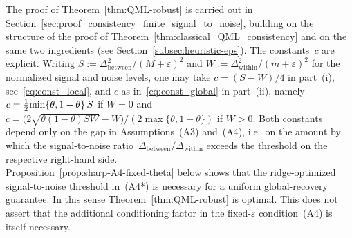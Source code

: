 \documentclass[10pt, letterpaper]{amsart}
\def\min{{\rm min}}
\begin{document}
The proof of Theorem~\ref{thm:QML-robust} is carried out in Section~\ref{sec:proof_consistency_finite_signal_to_noise}, building on the structure of the proof of Theorem~\ref{thm:classical_QML_consistency} and on the same two ingredients (see Section~\ref{subsec:heuristic-eps}).  The constants~$c$ are explicit. Writing $S:=\Delta_{\text{between}}^2/(M+\varepsilon)^2$ and $W:=\Delta_{\text{within}}^2/(m+\varepsilon)^2$ for the normalized signal and noise levels, one may take $c=(S-W)/4$ in part~(i), see~\eqref{eq:const_local}, and $c$ as in~\eqref{eq:const_global} in part~(ii), namely $c=\tfrac12\min\{\theta,1-\theta\}\,S$ if $W=0$ and $c=\bigl(2\sqrt{\theta(1-\theta)SW}-W\bigr)/(2\max\{\theta,1-\theta\})$ if $W>0$. Both constants depend only on the gap in Assumptions~(A3) and~(A4), i.e.~on the amount by which the signal-to-noise ratio~$\Delta_{\text{between}}/\Delta_{\text{within}}$ exceeds the threshold on the respective right-hand side.\\

Proposition~\ref{prop:sharp-A4-fixed-theta} below shows
that the ridge-optimized signal-to-noise threshold in~\textup{(A4*)} is
necessary for a uniform global-recovery guarantee. In this sense
Theorem~\ref{thm:QML-robust} is optimal. This does not assert that the
additional conditioning factor in the fixed-$\varepsilon$
condition~\textup{(A4)} is itself necessary.
\end{document}
